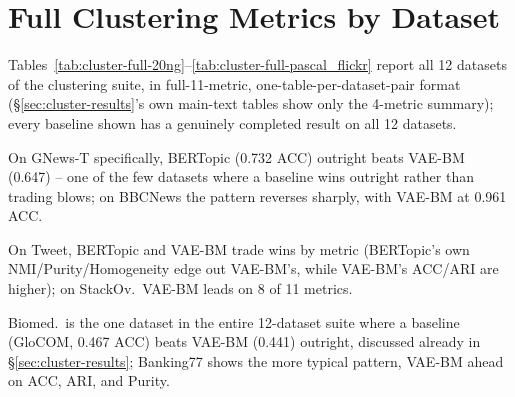 \documentclass[11pt]{article}
\begin{document}
\section{Full Clustering Metrics by Dataset}
\label{sec:appendix-cluster-full}

Tables~\ref{tab:cluster-full-20ng}--\ref{tab:cluster-full-pascal_flickr} report all 12 datasets of the clustering suite, in full-11-metric, one-table-per-dataset-pair format (\S\ref{sec:cluster-results}'s own main-text tables show only the 4-metric summary); every baseline shown has a genuinely completed result on all 12 datasets.







On GNews-T specifically, BERTopic (0.732 ACC) outright beats VAE-BM (0.647) -- one of the few datasets where a baseline wins outright rather than trading blows; on BBCNews the pattern reverses sharply, with VAE-BM at 0.961 ACC.



On Tweet, BERTopic and VAE-BM trade wins by metric (BERTopic's own NMI/Purity/Homogeneity edge out VAE-BM's, while VAE-BM's ACC/ARI are higher); on StackOv.\ VAE-BM leads on 8 of 11 metrics.



Biomed.\ is the one dataset in the entire 12-dataset suite where a baseline (GloCOM, 0.467 ACC) beats VAE-BM (0.441) outright, discussed already in \S\ref{sec:cluster-results}; Banking77 shows the more typical pattern, VAE-BM ahead on ACC, ARI, and Purity.


\end{document}

